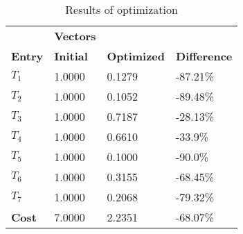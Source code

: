 \begin{table}[H]
\centering
\begin{tabular}{llll}
\textbf{}      & \cellcolor[HTML]{EFEFEF}\textbf{Vectors} & \textbf{} & \textbf{}         \\
\rowcolor[HTML]{EFEFEF} 
\textbf{Entry} & \textbf{Initial} & \textbf{Optimized} & \textbf{Difference} \\
$T_1$ & 1.0000 & 0.1279 & -87.21\% \\ 
$T_2$ & 1.0000 & 0.1052 & -89.48\% \\ 
$T_3$ & 1.0000 & 0.7187 & -28.13\% \\ 
$T_4$ & 1.0000 & 0.6610 & -33.9\% \\ 
$T_5$ & 1.0000 & 0.1000 & -90.0\% \\ 
$T_6$ & 1.0000 & 0.3155 & -68.45\% \\ 
$T_7$ & 1.0000 & 0.2068 & -79.32\% \\ 
\rowcolor[HTML]{EFEFEF} 
\textbf{Cost}  & 7.0000 & 2.2351 & -68.07\% \\ 
\end{tabular}
\caption{Results of optimization}
\label{tab:OptimizationAnalysis}
\end{table}